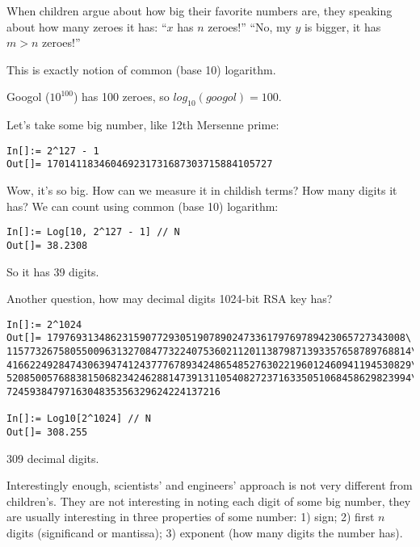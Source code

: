 
\leveldown{}


When children argue about how big their favorite numbers are, they speaking about how many zeroes it has:
``$x$ has $n$ zeroes!''
``No, my $y$ is bigger, it has $m>n$ zeroes!''

This is exactly notion of common (base 10) logarithm.

Googol ($10^{100}$) has 100 zeroes, so $log_{10} (googol) = 100$.

Let's take some big number, like 12th Mersenne prime:

\begin{lstlisting}[caption=Wolfram Mathematica]
In[]:= 2^127 - 1
Out[]= 170141183460469231731687303715884105727
\end{lstlisting}

Wow, it's so big. How can we measure it in childish terms? How many digits it has? We can count using common (base 10) logarithm:

\begin{lstlisting}[caption=Wolfram Mathematica]
In[]:= Log[10, 2^127 - 1] // N
Out[]= 38.2308
\end{lstlisting}

So it has 39 digits.

Another question, how may decimal digits 1024-bit RSA key has?

\begin{lstlisting}[caption=Wolfram Mathematica]
In[]:= 2^1024
Out[]= 17976931348623159077293051907890247336179769789423065727343008\
1157732675805500963132708477322407536021120113879871393357658789768814\
4166224928474306394741243777678934248654852763022196012460941194530829\
5208500576883815068234246288147391311054082723716335051068458629823994\
7245938479716304835356329624224137216

In[]:= Log10[2^1024] // N
Out[]= 308.255
\end{lstlisting}

309 decimal digits.


Interestingly enough, scientists' and engineers' approach is not very different from children's.
They are not interesting in noting each digit of some big number, they are usually interesting in three properties of some number:
1) sign; 2) first $n$ digits (significand or mantissa); 3) exponent (how many digits the number has).

